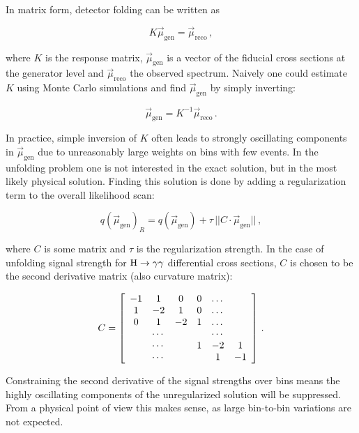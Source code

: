 In matrix form, detector folding can be written as
% 
\begin{linenomath*}
\begin{equation}
K \vec{\mu}_{\text{gen}} = \vec{\mu}_{\text{reco}}
\,,
\end{equation}
\end{linenomath*}
%
where $K$ is the response matrix, $\vec{\mu}_{\text{gen}}$ is a vector of the fiducial cross sections at the generator level and $\vec{\mu}_{\text{reco}}$ the observed spectrum.
% 
Naively one could estimate $K$ using Monte Carlo simulations and find $\vec{\mu}_{\text{gen}}$ by simply inverting:
% 
\begin{linenomath*}
\begin{equation}
\vec{\mu}_{\text{gen}} = K^{-1} \vec{\mu}_{\text{reco}}
\,.
\end{equation}
\end{linenomath*}
%
In practice, simple inversion of $K$ often leads to strongly oscillating components in $\vec{\mu}_{\text{gen}}$ due to unreasonably large weights on bins with few events. In the unfolding problem one is not interested in the exact solution, but in the most likely physical solution. Finding this solution is done by adding a regularization term to the overall likelihood scan:
% 
\begin{linenomath*}
\begin{equation}
q(\vec{\mu}_{\text{gen}})_R = q(\vec{\mu}_{\text{gen}}) + \tau \, || C \cdot \vec{\mu}_{\text{gen}} ||
\,,
\label{eq:likelihoodaddition}
\end{equation}
\end{linenomath*}
% 
where $C$ is some matrix and $\tau$ is the regularization strength. In the case of unfolding signal strength for $\mathrm{H}\to\mathrm{\gamma}\mathrm{\gamma}$ differential cross sections, $C$ is chosen to be the second derivative matrix (also curvature matrix):
% 
\begin{linenomath*}
\begin{equation}
C = \left[
\begin{array}{c c c c c c}
-1 & 1 & 0 & 0 & \dots &  \\
1 & -2 & 1 & 0 & \dots &  \\
0 & 1 & -2 & 1 & \dots &  \\
  & \cdots &   &   & \cdots &  \\
  & \cdots &   & 1 & -2 & 1 \\
  & \cdots &   &   & 1 & -1
\end{array}
\right]
\,.
\end{equation}
\end{linenomath*}
%
Constraining the second derivative of the signal strengths over bins means the highly oscillating components of the unregularized solution will be suppressed.
% 
From a physical point of view this makes sense, as large bin-to-bin variations are not expected.


